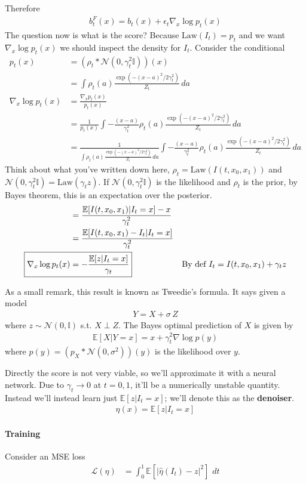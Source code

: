 Therefore
\begin{align}
	\boxed{b^F_t(x) = b_t(x) + \epsilon_t \nabla_x \log p_t(x)}
\end{align}
The question now is what is the score?
Because $\text{Law}(I_t) = p_t$ and we want $\nabla_x \log p_t(x)$ we should inspect the density for $I_t$. Consider the conditional
\begin{align}
	p_t(x) & = (\rho_t * \mathcal N(0, \gamma_t^2 \mathbb I))(x)\\
	& = \int \rho_t(a) \frac{\exp(-(x-a)^2/2\gamma_t^2)}{Z_t} \, da\\
	\nabla_x \log p_t(x) & = \frac{\nabla_x p_t(x)}{p_t(x)} \\
	& = \frac{1}{p_t(x)}\int -\frac{(x-a)}{\gamma_t^2}\rho_t(a) \frac{\exp(-(x-a)^2/2\gamma_t^2)}{Z_t} \, da\\
	& = \frac{1}{ \int \rho_t(a) \frac{\exp(-(x-a)^2/2\gamma_t^2)}{Z_t} \, da} \int -\frac{(x-a)}{\gamma_t^2}\rho_t(a) \frac{\exp(-(x-a)^2/2\gamma_t^2)}{Z_t} \, da
\end{align}
Think about what you've written down here, $\rho_t = \text{Law}(I(t,x_0,x_1))$ and $\mathcal N(0, \gamma_t^2 \mathbb I) = \text{Law}(\gamma_t z )$. If $\mathcal N(0, \gamma_t^2 \mathbb I)$ is the likelihood and $\rho_t$ is the prior, by Bayes theorem, this is an expectation over the posterior.
\begin{align}
	& = \frac{\mathbb E[I(t,x_0,x_1) | I_t = x]  - x}{\gamma_t^2}\\
	& = \frac{\mathbb E[I(t,x_0, x_1) - I_t | I_t =x]}{\gamma_t^2}\\
	\Aboxed{\nabla_x \log p_t(x) & = - \frac{\mathbb E[z|I_t = x]}{\gamma_t}} & \text{By def } I_t = I(t,x_0,x_1) + \gamma_t z
\end{align}
\begin{sidework}
	As a small remark, this result is known as Tweedie's formula. It says given a model
	\begin{align}
		Y = X + \sigma \, Z
	\end{align}
	where $z \sim \mathcal N(0, \mathbb I)$ s.t. $X \perp Z$. The Bayes optimal prediction of $X$ is given by
	\begin{align}
		\mathbb E[X | Y=x] = x + \gamma_t^2 \nabla \log p(y)
	\end{align}
	where $p(y) = (p_X * \mathcal N(0, \sigma^2))(y)$ is the likelihood over $y$.
\end{sidework}
Directly the score is not very viable, so we'll approximate it with a neural network. Due to $\gamma_t \to 0$ at $t=0,1$, it'll be a numerically unstable quantity. Instead we'll instead learn just $\mathbb E[z | I_t = x]$; we'll denote this as the \textbf{denoiser}.
\begin{align}
	\boxed{\eta(x) = \mathbb E[z | I_t = x]}
\end{align}

\paragraph{Training} Consider an MSE loss
\begin{align}
	\mathcal L(\hat \eta) & = \int_0^1 \mathbb E[ |\hat \eta(I_t) - z|^2 ]\, \,dt 
\end{align}

















